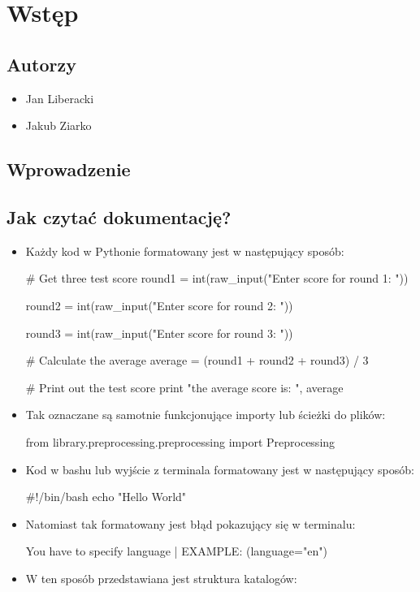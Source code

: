 \section{Wstęp}
 
\subsection{Autorzy}
\begin{itemize}
\item Jan Liberacki
\item Jakub Ziarko
\end{itemize}

\subsection{Wprowadzenie}

\newpage
\subsection{Jak czytać dokumentację?}


\begin{itemize}
\item Każdy kod w Pythonie formatowany jest w następujący sposób:

\begin{python}
# Get three test score
round1 = int(raw_input("Enter score for round 1: "))

round2 = int(raw_input("Enter score for round 2: "))

round3 = int(raw_input("Enter score for round 3: "))
   
# Calculate the average
average = (round1 + round2 + round3) / 3

# Print out the test score
print "the average score is: ", average 

\end{python}

\item Tak oznaczane są samotnie funkcjonujące importy lub ścieżki do plików:
\begin{import}
from library.preprocessing.preprocessing import Preprocessing
\end{import}

\item Kod w bashu lub wyjście z terminala formatowany jest w następujący sposób:

\begin{bash}
#!/bin/bash
echo "Hello World"
\end{bash}

\item Natomiast tak formatowany jest błąd pokazujący się w terminalu:
\begin{consolerror}
You have to specify language | EXAMPLE: (language="en")
\end{consolerror}



\item W ten sposób przedstawiana jest struktura katalogów:
\myspace
{}

\end{itemize}